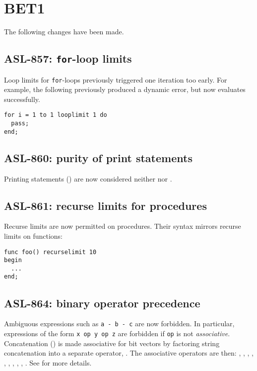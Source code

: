 \section{BET1}

The following changes have been made.

\subsection{ASL-857: \texttt{for}-loop limits}

Loop limits for \texttt{for}-loops previously triggered one iteration too early.
For example, the following previously produced a dynamic error, but now evaluates successfully.

\begin{lstlisting}
for i = 1 to 1 looplimit 1 do
  pass;
end;
\end{lstlisting}

\subsection{ASL-860: purity of print statements}

Printing statements () are now considered neither \pure{} nor \readonly{}.

\subsection{ASL-861: recurse limits for procedures}

Recurse limits are now permitted on procedures.
Their syntax mirrors recurse limits on functions:
\begin{lstlisting}
func foo() recurselimit 10
begin
  ...
end;
\end{lstlisting}

\subsection{ASL-864: binary operator precedence}

Ambiguous expressions such as \texttt{a - b - c} are now forbidden.
In particular, expressions of the form \texttt{x op y op z} are forbidden if \texttt{op} is not \emph{associative}.
Concatenation (\Tcoloncolon) is made associative for bit vectors by factoring string concatenation into a separate operator, \Tplusplus.
The associative operators are then:
\Tplus, \Tmul, \Tband, \Tbor, \Tand, \Tor, \Txor, \Tbeq, \Tplusplus, \Tcoloncolon.
See  for more details.
